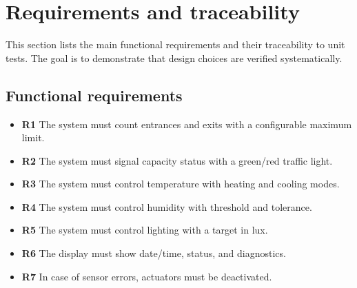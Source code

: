 \chapter{Requirements and traceability}

This section lists the main functional requirements and their traceability to unit tests. The goal is to demonstrate that design choices are verified systematically.

\section{Functional requirements}
\begin{itemize}
  \item \textbf{R1} The system must count entrances and exits with a configurable maximum limit.
  \item \textbf{R2} The system must signal capacity status with a green/red traffic light.
  \item \textbf{R3} The system must control temperature with heating and cooling modes.
  \item \textbf{R4} The system must control humidity with threshold and tolerance.
  \item \textbf{R5} The system must control lighting with a target in lux.
  \item \textbf{R6} The display must show date/time, status, and diagnostics.
  \item \textbf{R7} In case of sensor errors, actuators must be deactivated.
\end{itemize}

